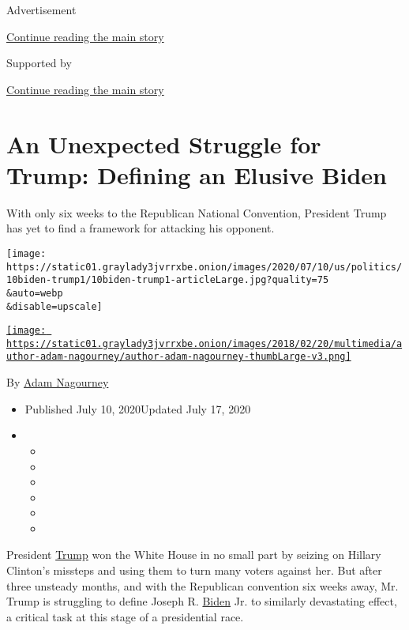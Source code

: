 Advertisement

\protect\hyperlink{after-top}{Continue reading the main story}

Supported by

\protect\hyperlink{after-sponsor}{Continue reading the main story}

\hypertarget{an-unexpected-struggle-for-trump-defining-an-elusive-biden}{%
\section{An Unexpected Struggle for Trump: Defining an Elusive
Biden}\label{an-unexpected-struggle-for-trump-defining-an-elusive-biden}}

With only six weeks to the Republican National Convention, President
Trump has yet to find a framework for attacking his opponent.

\texttt{[image: https://static01.graylady3jvrrxbe.onion/images/2020/07/10/us/politics/10biden-trump1/10biden-trump1-articleLarge.jpg?quality=75\\\&auto=webp\\\&disable=upscale]}

\href{https://www.nytimes3xbfgragh.onion/by/adam-nagourney}{\texttt{[image: https://static01.graylady3jvrrxbe.onion/images/2018/02/20/multimedia/author-adam-nagourney/author-adam-nagourney-thumbLarge-v3.png]}}

By \href{https://www.nytimes3xbfgragh.onion/by/adam-nagourney}{Adam
Nagourney}

\begin{itemize}
\item
  Published July 10, 2020Updated July 17, 2020
\item
  \begin{itemize}
  \item
  \item
  \item
  \item
  \item
  \item
  \end{itemize}
\end{itemize}

President
\href{https://www.nytimes3xbfgragh.onion/2020/07/17/us/trump-biden-2020-election.html}{Trump}
won the White House in no small part by seizing on Hillary Clinton's
missteps and using them to turn many voters against her. But after three
unsteady months, and with the Republican convention six weeks away, Mr.
Trump is struggling to define Joseph R.
\href{https://www.nytimes3xbfgragh.onion/2020/07/17/us/trump-biden-2020-election.html}{Biden}
Jr. to similarly devastating effect, a critical task at this stage of a
presidential race.

